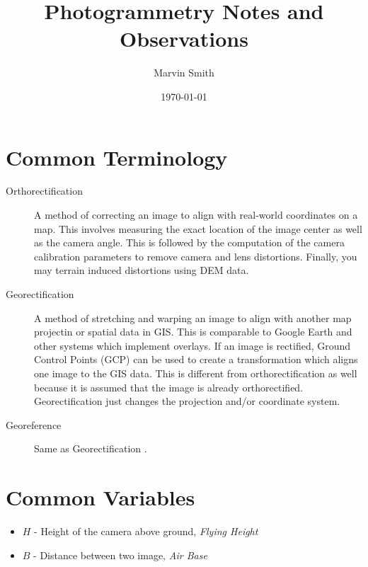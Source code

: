 \documentclass[12pt]{report}
\title{Photogrammetry Notes and Observations}
\author{Marvin Smith}
\date{\today}
\begin{document}
\maketitle

\tableofcontents


\section*{Common Terminology}

\begin{description}
\item[Orthorectification] A method of correcting an image to align with real-world coordinates on a map. 
                          This involves measuring the exact location of the image center as well as 
                          the camera angle.  This is followed by the computation of the camera calibration 
                          parameters to remove camera and lens distortions.  Finally, you may terrain
                          induced distortions using DEM data. 

\item[Georectification] A method of stretching and warping an image to align with another map projectin or spatial 
                        data in GIS.  This is comparable to Google Earth and other systems which implement overlays. 
                        If an image is rectified, Ground Control Points (GCP) can be used to create a transformation which 
                        aligns one image to the GIS data.  This is different from orthorectification as well because
                        it is assumed that the image is already orthorectified. Georectification just changes the 
                        projection and/or coordinate system. 

\item[Georeference]     Same as Georectification  .
\end{description}


\section*{Common Variables}

\begin{itemize}
\item $H$ - Height of the camera above ground, \emph{Flying Height}
\item $B$ - Distance between two image, \emph{Air Base}
\end{itemize}




\nocite{*}

\printindex
\end{document}
